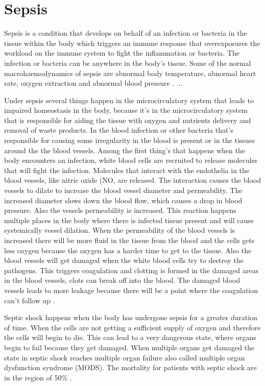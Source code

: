 \section{Sepsis}

Sepsis is a condition that develops on behalf of an infection or bacteria in the tissue within the body which triggers an immune response that overexposures the workload on the immune system to fight the inflammation or bacteria. The infection or bacteria can be anywhere in the body’s tissue. Some of the normal macrohaemodynamics of sepsis are abnormal body temperature, abnormal heart rate, oxygen extraction and abnormal blood pressure \cite{plunta2010}.
...

Under sepsis several things happen in the microcirculatory system that leads to impaired homeostasis in the body, because it’s in the microcirculatory system that is responsible for aiding the tissue with oxygen and nutrients delivery and removal of waste products. In the blood infection or other bacteria that’s responsible for causing some irregularity in the blood is present or in the tissues around the the blood vessels. Among the first thing’s that happens when the body encounters an infection, white blood cells are recruited to release molecules that will fight the infection. Molecules that interact with the endothelia in the blood vessels, like nitric oxide (NO, are released. The interaction causes the blood vessels to dilate to increase the blood vessel diameter and permeability. The increased diameter slows down the blood flow, which causes a drop in blood pressure. Also the vessels permeability is increased. This reaction happens multiple places in the body where there is infected tissue present and will cause systemically vessel dilation.
When the permeability of the blood vessels is increased there will be more fluid in the tissue from the blood and the cells gets less oxygen because the oxygen has a harder time to get to the tissue. Also the blood vessels will get damaged when the white blood cells try to destroy the pathogens. This triggers coagulation and clotting is formed in the damaged areas in the blood vessels, clots can break off into the blood. The damaged blood vessels leads to more leakage because there will be a point where the coagulation can’t follow up \cite{baudouin200}.

Septic shock happens when the body has undergone sepsis for a greater duration of time. When the cells are not getting a sufficient supply of oxygen and therefore the cells will begin to die. This can lead to a very dangerous state, where organs begin to fail because they get damaged. When multiple organs get damaged the state in septic shock reaches multiple organ failure also called multiple organ dysfunction syndrome (MODS). The mortality for patients with septic shock are in the region of 50\% \cite{baudouin200}. 

